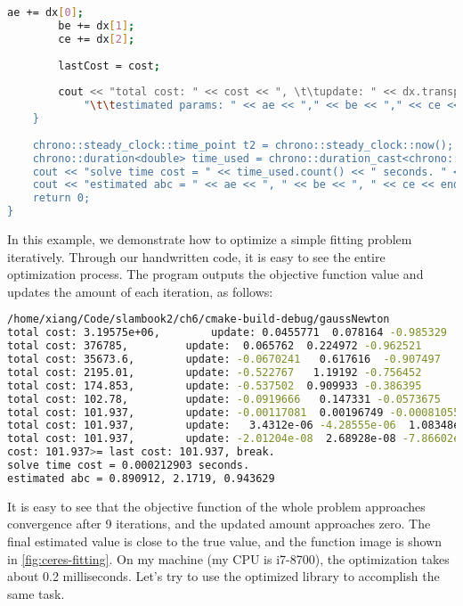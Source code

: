 \begin{lstlisting}[language=sh,caption=slambook2/ch6/gaussNewton.cpp]
        ae += dx[0];
        be += dx[1];
        ce += dx[2];
        
        lastCost = cost;
        
        cout << "total cost: " << cost << ", \t\tupdate: " << dx.transpose() <<
            "\t\testimated params: " << ae << "," << be << "," << ce << endl;
    }
    
    chrono::steady_clock::time_point t2 = chrono::steady_clock::now();
    chrono::duration<double> time_used = chrono::duration_cast<chrono::duration<double>>(t2 - t1);
    cout << "solve time cost = " << time_used.count() << " seconds. " << endl;
    cout << "estimated abc = " << ae << ", " << be << ", " << ce << endl;
    return 0;
}
\end{lstlisting}
In this example, we demonstrate how to optimize a simple fitting problem iteratively. Through our handwritten code, it is easy to see the entire optimization process. The program outputs the objective function value and updates the amount of each iteration, as follows:

\begin{lstlisting}[language=sh,caption=Terminal output:]
/home/xiang/Code/slambook2/ch6/cmake-build-debug/gaussNewton
total cost: 3.19575e+06, 		update: 0.0455771  0.078164 -0.985329		estimated params: 2.04558,-0.921836,4.01467
total cost: 376785, 		update:  0.065762  0.224972 -0.962521		estimated params: 2.11134,-0.696864,3.05215
total cost: 35673.6, 		update: -0.0670241   0.617616  -0.907497		estimated params: 2.04432,-0.0792484,2.14465
total cost: 2195.01, 		update: -0.522767   1.19192 -0.756452		estimated params: 1.52155,1.11267,1.3882
total cost: 174.853, 		update: -0.537502  0.909933 -0.386395		estimated params: 0.984045,2.0226,1.00181
total cost: 102.78, 		update: -0.0919666   0.147331 -0.0573675		estimated params: 0.892079,2.16994,0.944438
total cost: 101.937, 		update: -0.00117081  0.00196749 -0.00081055		estimated params: 0.890908,2.1719,0.943628
total cost: 101.937, 		update:   3.4312e-06 -4.28555e-06  1.08348e-06		estimated params: 0.890912,2.1719,0.943629
total cost: 101.937, 		update: -2.01204e-08  2.68928e-08 -7.86602e-09		estimated params: 0.890912,2.1719,0.943629
cost: 101.937>= last cost: 101.937, break.
solve time cost = 0.000212903 seconds.
estimated abc = 0.890912, 2.1719, 0.943629
\end{lstlisting}
It is easy to see that the objective function of the whole problem approaches convergence after 9 iterations, and the updated amount approaches zero. The final estimated value is close to the true value, and the function image is shown in \autoref{fig:ceres-fitting}. On my machine (my CPU is i7-8700), the optimization takes about 0.2 milliseconds. Let's try to use the optimized library to accomplish the same task.


